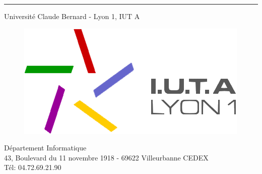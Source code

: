 \begin{titlepage}
\begin{center}
		\hrule
		\begin{center}
			Université Claude Bernard - Lyon 1, IUT A
			\begin{figure}[!htb]
				\begin{center}
					\includegraphics[scale=.25]{Contenu/Images/Logo_IUTA.png}
				\end{center}
			\end{figure}
			Département Informatique\\
			43, Boulevard du 11 novembre 1918 - 69622 Villeurbanne CEDEX\\
			Tél: 04.72.69.21.90
		\end{center}
	\end{center}
\end{titlepage}